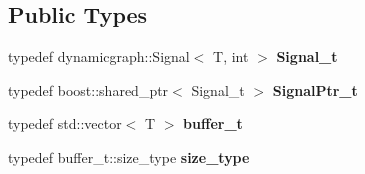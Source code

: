 \subsection*{Public Types}
\begin{DoxyCompactItemize}
\item 
\mbox{\label{structdynamic__graph_1_1internal_1_1BindedSignal_acdaa84070d25691ad72731f04be389fa}} 
typedef dynamicgraph\+::\+Signal$<$ T, int $>$ {\bfseries Signal\+\_\+t}
\item 
\mbox{\label{structdynamic__graph_1_1internal_1_1BindedSignal_a1fd1a14632e5ebfecd9b32aa3d295194}} 
typedef boost\+::shared\+\_\+ptr$<$ Signal\+\_\+t $>$ {\bfseries Signal\+Ptr\+\_\+t}
\item 
\mbox{\label{structdynamic__graph_1_1internal_1_1BindedSignal_a16a9c323d576287f0f053236b43ec78e}} 
typedef std\+::vector$<$ T $>$ {\bfseries buffer\+\_\+t}
\item 
\mbox{\label{structdynamic__graph_1_1internal_1_1BindedSignal_a20afb053e85bdb54b31702d0d58ded53}} 
typedef buffer\+\_\+t\+::size\+\_\+type {\bfseries size\+\_\+type}
\end{DoxyCompactItemize}
